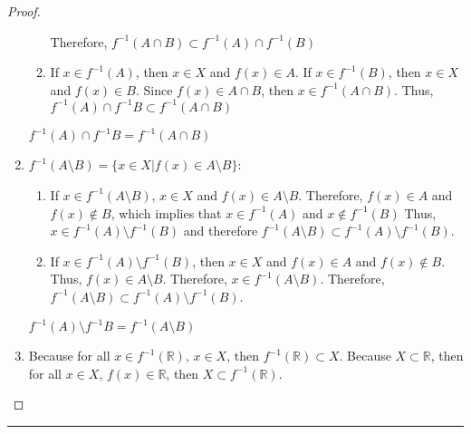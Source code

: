 \documentclass[openany, amssymb, psamsfonts]{amsart}
\newcommand{\bbR}{\mathbb{R}}
\newcommand{\sm}{\setminus}
\theoremstyle{definition}
\numberwithin{equation}{section}
\begin{document}
\begin{proof}
\begin{enumerate}
\begin{enumerate}
\begin{enumerate}
        \end{enumerate}
        Therefore, $f^{-1}(A\cap B) \subset  f^{-1}(A) \cap  f^{-1}(B)$
        \item If $x\in f^{-1}(A)$, then $x\in X$ and $f(x) \in A$. If $x\in f^{-1}(B)$, then $x\in X$ and $f(x) \in B$. Since $f(x)\in A \cap B$, then $x\in f^{-1}(A\cap B)$. Thus, $f^{-1}(A)\cap f^{-1}B \subset f^{-1}(A\cap B)$
    \end{enumerate}
    $f^{-1}(A)\cap f^{-1}B = f^{-1}(A\cap B)$
    \item $f^{-1}(A\sm B) = \{x\in X | f(x) \in A\sm B\}$:
    \begin{enumerate}
        \item If $x\in f^{-1}(A\sm B)$, $x\in X$ and $f(x) \in A\sm B$. Therefore, $f(x) \in A$ and $f(x) \notin B$, which implies that $x\in f^{-1}(A)$ and $x\notin f^{-1}(B)$ Thus, $x\in f^{-1}(A)\sm f^{-1}(B)$ and therefore $f^{-1}(A\sm B) \subset f^{-1}(A)\sm f^{-1}(B)$.
        \item If $x\in f^{-1}(A)\sm f^{-1}(B)$, then $x\in X$ and $f(x) \in A$ and $f(x) \notin B$. Thus, $f(x) \in A\sm B$. Therefore, $x\in f^{-1}(A\sm B)$. Therefore, $f^{-1}(A\sm B) \subset f^{-1}(A)\sm f^{-1}(B)$.
    \end{enumerate}
    $f^{-1}(A)\sm f^{-1}B = f^{-1}(A\sm B)$
    \item Because for all $x\in f^{-1}(\bbR)$, $x\in X$, then $f^{-1}(\bbR) \subset X$. Because $X\subset \bbR$, then for all $x\in X$, $f(x)\in \bbR$, then $X\subset f^{-1}(\bbR)$.
\end{enumerate}
\end{proof} \vspace{4pt}     \hrule   \vspace{4pt}
\end{document}
